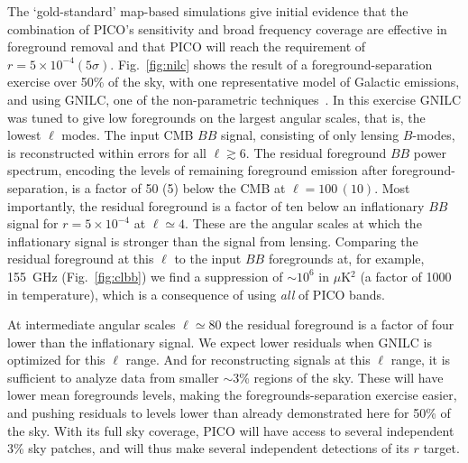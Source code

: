 \documentclass[PICOReport.tex]{subfiles}
\begin{document}
The `gold-standard' map-based simulations give initial evidence that the combination of PICO's sensitivity and broad frequency coverage are effective in foreground removal and that PICO will reach the requirement of $r = 5\times 10^{-4} (5\sigma)$. Fig.~\ref{fig:nilc} shows the result of a foreground-separation exercise over 50\% of the sky, with one representative model of Galactic emissions, and using GNILC, one of the non-parametric techniques~\citep{gnilc}.  In this exercise GNILC was tuned to give low foregrounds on the largest angular scales, that is, the lowest $\ell$ modes. The input CMB $BB$ signal, consisting of only lensing $B$-modes, is reconstructed within errors for all $\ell \gtrsim 6$.  The residual foreground $BB$ power spectrum, encoding the levels of remaining foreground emission after foreground-separation, is a factor of 50 (5) below the CMB at $\ell=100\, (10)$. Most importantly, the residual foreground is a factor of ten below an inflationary $BB$ signal for  $r = 5\times 10^{-4}$ at $\ell \simeq 4$.  These are the angular scales at which the inflationary signal is stronger than the signal from lensing. Comparing the residual foreground at this $\ell$ to the input $BB$ foregrounds at, for example, 155~GHz (Fig.~\ref{fig:clbb}) we find a suppression of $\sim10^{6}$ in $\mu$K$^{2}$ (a factor of 1000 in temperature), which is a consequence of using {\it all} of PICO bands.

At intermediate angular scales $\ell \simeq 80$ the residual foreground is a factor of four lower than the inflationary signal. We expect lower residuals when GNILC is optimized for this $\ell$ range. And for reconstructing signals at this $\ell$ range, it is sufficient to analyze data from smaller $\sim$3\% regions of the sky. These will have lower mean foregrounds levels, making the foregrounds-separation exercise easier, and pushing residuals to levels lower than already demonstrated here for 50\% of the sky. With its full sky coverage, PICO will have access to several independent 3\% sky patches, and will thus make several independent detections of its $r$ target. 


\end{document}

